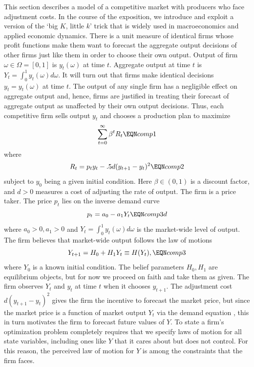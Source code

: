   This section describes a model of a competitive market with
producers who face adjustment costs. %
In the course of the exposition, we
 introduce and exploit  a version of the `big $K$, little $k$' trick that is widely used in macroeconomics and applied economic dynamics.
 There is a unit measure of  identical firms whose profit functions
make them want to forecast the aggregate output decisions
of other firms just like them in order to choose
their own output.  Output of firm $\omega \in \Omega = [0, 1]$ is $y_t(\omega)$ at time $t$.  Aggregate output 
at time $t$ is $Y_t = \int_0^1 y_t(\omega) d \omega$.  It will turn out that firms make identical decisions 
$y_t = y_t(\omega)$ at time $t$.     The output of any single firm has a negligible effect on
aggregate output and, hence, firms are justified in treating their forecast
of aggregate output as unaffected by their own output decisions.
  Thus, each  competitive firm sells  output $y_t$
and chooses a production plan to maximize
$$ \sum_{t=0}^\infty \beta^t R_t  \EQN comp1 $$
where
$$ R_t = p_t y_t - .5 d (y_{t+1} - y_t )^2 \EQN comp2 $$
subject to $y_0$ being a given initial condition.  Here
$\beta \in (0,1)$ is a discount factor, and $d >0$ measures
a cost of adjusting the rate of output.  The firm is a
price taker.  The price $p_t$ lies on the inverse demand curve
$$ p_t = a_0 - a_1 Y_t \EQN comp3d $$
where $a_0 >0, a_1 > 0 $ and $Y_t = \int_0^1 y_t(\omega) d \omega$ is the market-wide level of
output.
The firm believes that market-wide output
follows the law of motions
$$ Y_{t+1} = H_0 + H_1 Y_t \equiv H(Y_t) , \EQN comp3 $$
where $Y_0$ is a known initial condition.  The
belief parameters $H_0, H_1$ are   equilibrium
objects, but for now we proceed on faith and
take them  as given.
The firm observes $Y_t$ and $y_t$ at time $t$ when it chooses
$y_{t+1}$.    The adjustment cost $d(y_{t+1}-y_t)^2$ gives
the firm the incentive to forecast the market price, but since the market price
is a function of market output $Y_t$ via the demand equation , this in turn motivates the firm to forecast future
values of $Y$.  To state a firm's optimization problem completely requires that
we specify laws of motion for all state variables, including ones like $Y$ that it cares
about but does not control.  For this reason, the perceived law of motion  for $Y$ is among the constraints
that the firm faces.

